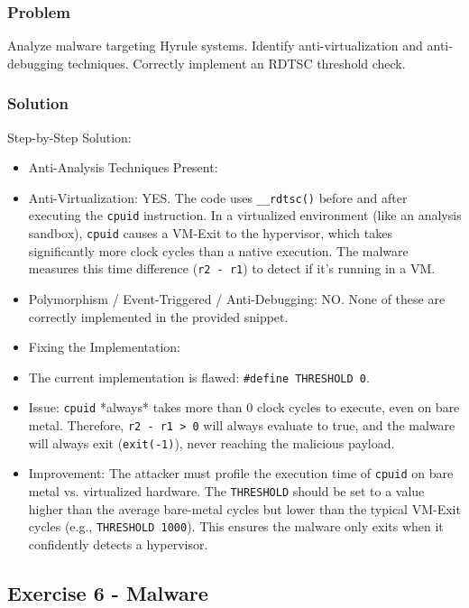 \documentclass{article}
\begin{document}
\subsubsection*{Problem}
Analyze malware targeting Hyrule systems. Identify anti-virtualization and anti-debugging techniques. Correctly implement an RDTSC threshold check.

\subsubsection*{Solution}
Step-by-Step Solution:

\begin{itemize}
    \item[\textbf{1.}] Anti-Analysis Techniques Present:
    \item Anti-Virtualization: YES. The code uses \texttt{\_\_rdtsc()} before and after executing the \texttt{cpuid} instruction. In a virtualized environment (like an analysis sandbox), \texttt{cpuid} causes a VM-Exit to the hypervisor, which takes significantly more clock cycles than a native execution. The malware measures this time difference (\texttt{r2 - r1}) to detect if it's running in a VM.
    \item Polymorphism / Event-Triggered / Anti-Debugging: NO. None of these are correctly implemented in the provided snippet.

    \item[\textbf{2.}] Fixing the Implementation:
    \item The current implementation is flawed: \texttt{\#define THRESHOLD 0}.
    \item Issue: \texttt{cpuid} *always* takes more than 0 clock cycles to execute, even on bare metal. Therefore, \texttt{r2 - r1 > 0} will always evaluate to true, and the malware will always exit (\texttt{exit(-1)}), never reaching the malicious payload.
    \item Improvement: The attacker must profile the execution time of \texttt{cpuid} on bare metal vs. virtualized hardware. The \texttt{THRESHOLD} should be set to a value higher than the average bare-metal cycles but lower than the typical VM-Exit cycles (e.g., \texttt{THRESHOLD 1000}). This ensures the malware only exits when it confidently detects a hypervisor.
\end{itemize}

\subsection{Exercise 6 - Malware}
\end{document}
